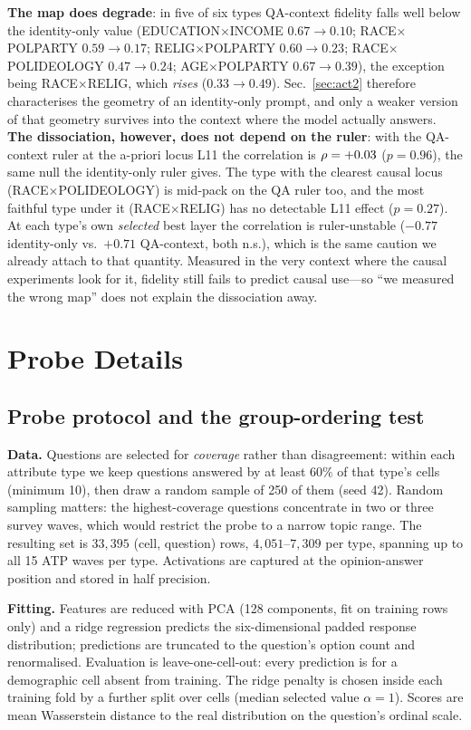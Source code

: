 \textbf{The map does degrade}: in five of six types QA-context fidelity falls well below the
identity-only value (EDUCATION$\times$INCOME $0.67\to0.10$;
RACE$\times$POLPARTY $0.59\to0.17$; RELIG$\times$POLPARTY
$0.60\to0.23$; RACE$\times$POLIDEOLOGY $0.47\to0.24$;
AGE$\times$POLPARTY $0.67\to0.39$), the exception being
RACE$\times$RELIG, which \emph{rises} ($0.33\to0.49$).
Sec.~\ref{sec:act2} therefore characterises the geometry of an
identity-only prompt, and only a weaker version of that geometry
survives into the context where the model actually answers.
\textbf{The dissociation, however, does not depend on the ruler}: with
the QA-context ruler at the a-priori locus L11 the correlation is
$\rho=+0.03$ ($p=0.96$), the same null the identity-only ruler gives.
The type with the clearest causal locus (RACE$\times$POLIDEOLOGY) is
mid-pack on the QA ruler too, and the most faithful type under it
(RACE$\times$RELIG) has no detectable L11 effect ($p=0.27$). At each
type's own \emph{selected} best layer the correlation is ruler-unstable
($-0.77$ identity-only vs.\ $+0.71$ QA-context, both n.s.), which is
the same caution we already attach to that quantity. Measured in the
very context where the causal experiments look for it, fidelity still
fails to predict causal use---so ``we measured the wrong map'' does not
explain the dissociation away.

\section{Probe Details}

\subsection{Probe protocol and the group-ordering test}
\label{app:probe}
\textbf{Data.} Questions are selected for \emph{coverage} rather than
disagreement: within each attribute type we keep questions answered by at
least $60\%$ of that type's cells (minimum 10), then draw a random sample
of 250 of them (seed 42). Random sampling matters: the highest-coverage
questions concentrate in two or three survey waves, which would restrict
the probe to a narrow topic range. The resulting set is $33{,}395$
(cell, question) rows, $4{,}051$--$7{,}309$ per type, spanning up to all
15 ATP waves per type. Activations are captured at the opinion-answer
position and stored in half precision.

\textbf{Fitting.} Features are reduced with PCA (128 components, fit on
training rows only) and a ridge regression predicts the six-dimensional
padded response distribution; predictions are truncated to the question's
option count and renormalised. Evaluation is leave-one-cell-out: every
prediction is for a demographic cell absent from training. The ridge
penalty is chosen inside each training fold by a further split over cells
(median selected value $\alpha=1$). Scores are mean Wasserstein distance
to the real distribution on the question's ordinal scale.

